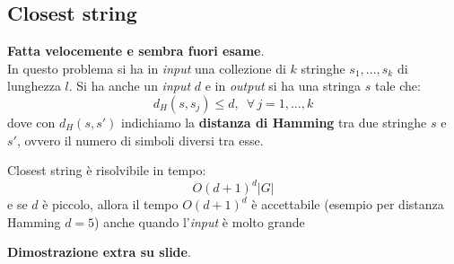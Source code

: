 \subsection{Closest string}
\textbf{Fatta velocemente e sembra fuori esame}.\\
In questo problema si ha in \textit{input} una collezione di $k$ stringhe
$s_1,\ldots,s_k$ di lunghezza $l$. Si ha anche un \textit{input} $d$ e in \textit{output} si ha
una stringa $s$ tale che:
\[d_H(s,s_j)\leq d,\,\,\,\forall\,j= 1,\ldots,k\]
dove con $d_H(s,s')$ indichiamo la \textbf{distanza di Hamming} tra due stringhe
$s$ e $s'$, ovvero il numero di simboli diversi tra esse.
\begin{teorema}
  Closest string è risolvibile in tempo:
  \[O(d+1)^d|G|\]
  e se $d$ è piccolo, allora il tempo $O(d+1)^d$ è accettabile (esempio per
  distanza Hamming $d = 5$) anche quando l’\textit{input} è molto grande  
\end{teorema}
\textbf{Dimostrazione extra su slide}.
